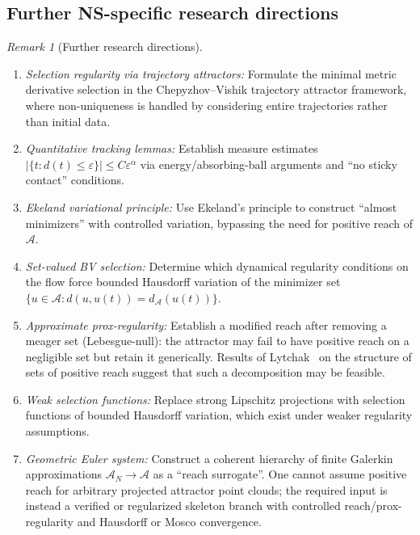 \documentclass[12pt,a4paper]{article}
\theoremstyle{definition}
\theoremstyle{plain}
\theoremstyle{remark}
\newtheorem{remark}[definition]{Remark}
\begin{document}
\subsection{Further NS-specific research directions}

\begin{remark}[Further research directions]
\label{rem:further-ns-logdist}
\begin{enumerate}
\item \emph{Selection regularity via trajectory attractors:} Formulate the minimal metric derivative selection in the Chepyzhov--Vishik trajectory attractor framework, where non-uniqueness is handled by considering entire trajectories rather than initial data.
\item \emph{Quantitative tracking lemmas:} Establish measure estimates $|\{t : d(t) \leq \varepsilon\}| \leq C \varepsilon^\alpha$ via energy/absorbing-ball arguments and ``no sticky contact'' conditions.
\item \emph{Ekeland variational principle:} Use Ekeland's principle to construct ``almost minimizers'' with controlled variation, bypassing the need for positive reach of $\mathcal{A}$.
\item \emph{Set-valued BV selection:} Determine which dynamical regularity conditions on the flow force bounded Hausdorff variation of the minimizer set $\{u \in \mathcal{A} : d(u, u(t)) = d_{\mathcal{A}}(u(t))\}$.
\item \emph{Approximate prox-regularity:} Establish a modified reach after removing a meager set (Lebesgue-null): the attractor may fail to have positive reach on a negligible set but retain it generically. Results of Lytchak~\cite{Lytchak2024} on the structure of sets of positive reach suggest that such a decomposition may be feasible.
\item \emph{Weak selection functions:} Replace strong Lipschitz projections with selection functions of bounded Hausdorff variation, which exist under weaker regularity assumptions.
\item \emph{Geometric Euler system:} Construct a coherent hierarchy of finite Galerkin approximations $\mathcal{A}_N \to \mathcal{A}$ as a ``reach surrogate''.  One cannot assume positive reach for arbitrary projected attractor point clouds; the required input is instead a verified or regularized skeleton branch with controlled reach/prox-regularity and Hausdorff or Mosco convergence.
\end{enumerate}
\end{remark}
\end{document}
